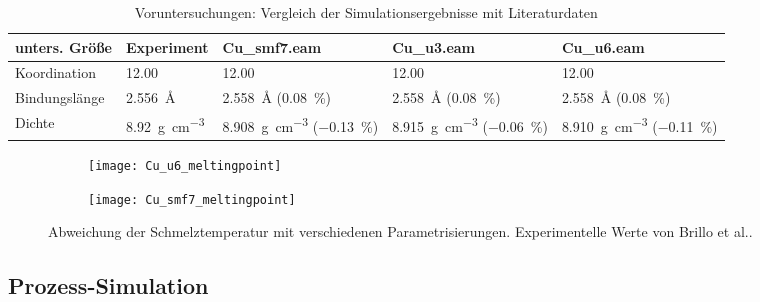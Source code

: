 \begin{table}[bht]
  \caption[Eigenschaften von Kupfer]{Voruntersuchungen: Vergleich der Simulationsergebnisse mit Literaturdaten}
  \label{tab:copperpreresults}
  \begin{tabularx}{\textwidth}{|lXXXX|}
    \hline
    \textbf{unters. Größe} & \textbf{Experiment} & \textbf{Cu\_smf7.eam} & \textbf{Cu\_u3.eam} & \textbf{Cu\_u6.eam} \\
    \hline
    Koordination   &  \SI{12.00}{} & \SI{12.00}{} & \SI{12.00}{} & \SI{12.00}{} \\
    Bindungslänge  &  \SI{2.556}{\angstrom} & \SI{2.558}{\angstrom} (\SI{0.08}{\percent}) & \SI{2.558}{\angstrom} (\SI{0.08}{\percent}) & \SI{2.558}{\angstrom} (\SI{0.08}{\percent}) \\
    Dichte         & \SI{8.92}{\gram\per\cubic\centi\meter} & \SI{8.908}{\gram\per\cubic\centi\meter} (\SI{-0.13}{\percent}) & \SI{8.915}{\gram\per\cubic\centi\meter} (\SI{-0.06}{\percent}) & \SI{8.910}{\gram\per\cubic\centi\meter}  (\SI{-0.11}{\percent}) \\
    \hline
  \end{tabularx}
\end{table}

\begin{figure}[hp]
  \captionsetup[subfigure]{singlelinecheck=false}
  \def\subfigwidth{7cm}
  \begin{subfigure}[t]{\subfigwidth}
    \texttt{[image: Cu\_u6\_meltingpoint]}
  \end{subfigure}
  \hfill
  \begin{subfigure}[t]{\subfigwidth}
    \texttt{[image: Cu\_smf7\_meltingpoint]}
  \end{subfigure}
  \caption[Abweichung der Schmelztemperaturen bei Kupfer-MD]{
    Abweichung der Schmelztemperatur mit verschiedenen Parametrisierungen.
    Experimentelle Werte von Brillo et al.\cite{brillo_density_2006}.
  }
  \label{fig:copperthermo}
\end{figure}

\subsection{Prozess-Simulation}

